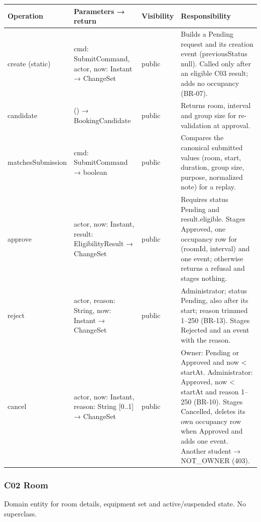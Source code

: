 \small
\setlength{\tabcolsep}{3pt}
\renewcommand{\arraystretch}{1.12}
\begin{longtable}{|p{}|p{}|p{}|p{}|}
\hline
\textbf{Operation} & \textbf{Parameters → return} & \textbf{Visibility} & \textbf{Responsibility} \\ \hline
\endfirsthead \hline
create (static) & cmd: SubmitCommand, actor, now: Instant → ChangeSet & public & Builds a Pending request and its creation event (previousStatus null). Called only after an eligible C03 result; adds no occupancy (BR-07). \\ \hline
candidate & () → BookingCandidate & public & Returns room, interval and group size for re-validation at approval. \\ \hline
matchesSubmission & cmd: SubmitCommand → boolean & public & Compares the canonical submitted values (room, start, duration, group size, purpose, normalized note) for a replay. \\ \hline
approve & actor, now: Instant, result: EligibilityResult → ChangeSet & public & Requires status Pending and result.eligible. Stages Approved, one occupancy row for (roomId, interval) and one event; otherwise returns a refusal and stages nothing. \\ \hline
reject & actor, reason: String, now: Instant → ChangeSet & public & Administrator; status Pending, also after its start; reason trimmed 1–250 (BR-13). Stages Rejected and an event with the reason. \\ \hline
cancel & actor, now: Instant, reason: String [0..1] → ChangeSet & public & Owner: Pending or Approved and now < startAt. Administrator: Approved, now < startAt and reason 1–250 (BR-10). Stages Cancelled, deletes its own occupancy row when Approved and adds one event. Another student → NOT\_OWNER (403). \\ \hline
\end{longtable}
\normalsize

\subsubsection{C02 Room}

Domain entity for room details, equipment set and active/suspended state. No superclass.\par

